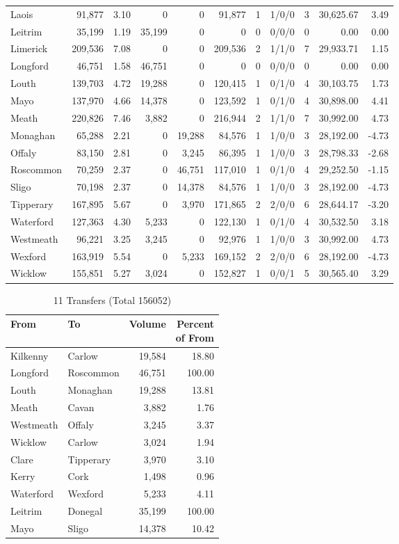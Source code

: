 \documentclass[a4paper]{article}
\begin{document}
\begin{longtable}{lrrrrrrlrrr}
Laois&91,877& 3.10&0&0&91,877&1&1/0/0&3&30,625.67& 3.49\\ 
Leitrim&35,199& 1.19&35,199&0&0&0&0/0/0&0& 0.00& 0.00\\ 
Limerick&209,536& 7.08&0&0&209,536&2&1/1/0&7&29,933.71& 1.15\\ 
Longford&46,751& 1.58&46,751&0&0&0&0/0/0&0& 0.00& 0.00\\ 
Louth&139,703& 4.72&19,288&0&120,415&1&0/1/0&4&30,103.75& 1.73\\ 
Mayo&137,970& 4.66&14,378&0&123,592&1&0/1/0&4&30,898.00& 4.41\\ 
Meath&220,826& 7.46&3,882&0&216,944&2&1/1/0&7&30,992.00& 4.73\\ 
Monaghan&65,288& 2.21&0&19,288&84,576&1&1/0/0&3&28,192.00&-4.73\\ 
Offaly&83,150& 2.81&0&3,245&86,395&1&1/0/0&3&28,798.33&-2.68\\ 
Roscommon&70,259& 2.37&0&46,751&117,010&1&0/1/0&4&29,252.50&-1.15\\ 
Sligo&70,198& 2.37&0&14,378&84,576&1&1/0/0&3&28,192.00&-4.73\\ 
Tipperary&167,895& 5.67&0&3,970&171,865&2&2/0/0&6&28,644.17&-3.20\\ 
Waterford&127,363& 4.30&5,233&0&122,130&1&0/1/0&4&30,532.50& 3.18\\ 
Westmeath&96,221& 3.25&3,245&0&92,976&1&1/0/0&3&30,992.00& 4.73\\ 
Wexford&163,919& 5.54&0&5,233&169,152&2&2/0/0&6&28,192.00&-4.73\\ 
Wicklow&155,851& 5.27&3,024&0&152,827&1&0/0/1&5&30,565.40& 3.29\\ 
\end{longtable}

\begin{table}[htbp]
\caption{11 Transfers (Total 156052)}
\centering
\begin{tabular}{llrr} \toprule
From &To &Volume &\shortstack{Percent\\of From} \\ \midrule
Kilkenny&Carlow&19,584&18.80\\ 
Longford&Roscommon&46,751&100.00\\ 
Louth&Monaghan&19,288&13.81\\ 
Meath&Cavan&3,882& 1.76\\ 
Westmeath&Offaly&3,245& 3.37\\ 
Wicklow&Carlow&3,024& 1.94\\ 
Clare&Tipperary&3,970& 3.10\\ 
Kerry&Cork&1,498& 0.96\\ 
Waterford&Wexford&5,233& 4.11\\ 
Leitrim&Donegal&35,199&100.00\\ 
Mayo&Sligo&14,378&10.42\\ 
\bottomrule
\end{tabular}
\end{table}
\end{document}

